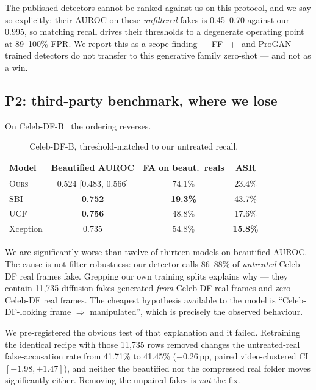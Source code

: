 \documentclass[conference]{IEEEtran}
\newcommand{\ours}{\textsc{Ours}}
\begin{document}
The published detectors cannot be ranked against us on this protocol, and we say so
explicitly: their AUROC on these \emph{unfiltered} fakes is 0.45--0.70 against our 0.995,
so matching recall drives their thresholds to a degenerate operating point at 89--100\% FPR.
We report this as a scope finding --- FF++- and ProGAN-trained detectors do not transfer to
this generative family zero-shot --- and not as a win.

\subsection{P2: third-party benchmark, where we lose}
\label{sec:celebdfb}
On Celeb-DF-B~\cite{libourel2024} the ordering reverses.

\begin{table}[t]
\caption{Celeb-DF-B, threshold-matched to our untreated recall.}
\label{tab:celebdfb}
\centering\small
\begin{tabular}{@{}lccc@{}}
\toprule
Model & Beautified AUROC & FA on beaut.\ reals & ASR \\
\midrule
\ours{}   & 0.524 [0.483, 0.566] & 74.1\% & 23.4\% \\
SBI       & \textbf{0.752}       & \textbf{19.3\%} & 43.7\% \\
UCF       & \textbf{0.756}       & 48.8\% & 17.6\% \\
Xception  & 0.735                & 54.8\% & \textbf{15.8\%} \\
\bottomrule
\end{tabular}
\end{table}

We are significantly worse than twelve of thirteen models on beautified AUROC. The cause is
not filter robustness: our detector calls 86--88\% of \emph{untreated} Celeb-DF real frames
fake. Grepping our own training splits explains why --- they contain 11{,}735 diffusion
fakes generated \emph{from} Celeb-DF real frames and zero Celeb-DF real frames. The cheapest
hypothesis available to the model is ``Celeb-DF-looking frame $\Rightarrow$ manipulated'',
which is precisely the observed behaviour.

We pre-registered the obvious test of that explanation and it failed. Retraining the
identical recipe with those 11{,}735 rows removed changes the untreated-real false-accusation
rate from 41.71\% to 41.45\% ($-0.26$\,pp, paired video-clustered CI $[-1.98, +1.47]$), and
neither the beautified nor the compressed real folder moves significantly either. Removing
the unpaired fakes is \emph{not} the fix.
\end{document}
